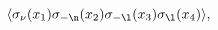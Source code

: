 \begin{equation}
\langle\sigma_\nu (x_1)\sigma_{-\n} (x_2)\sigma_{-\l}
(x_3)\sigma_{\l} (x_4)\rangle, \label{nulambda}
\end{equation}

